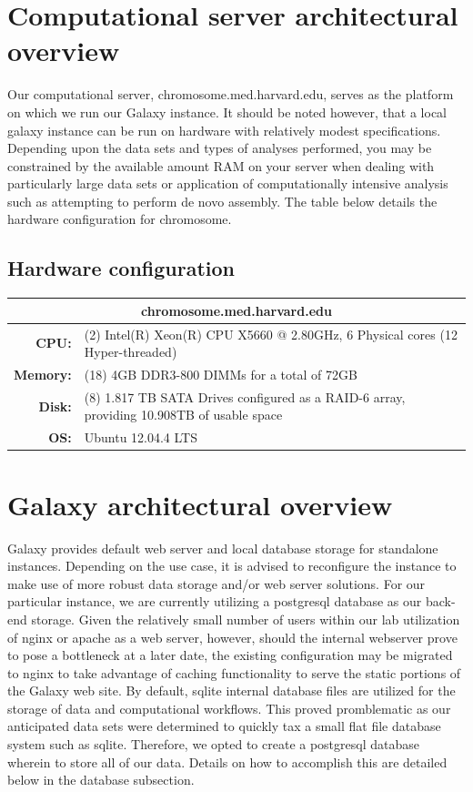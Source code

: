\documentclass[a4paper,10pt]{article}
\begin{document}
\section{Computational server architectural overview}
Our computational server, chromosome.med.harvard.edu, serves as the platform on which we run our Galaxy instance.  It should be noted however, that a local galaxy instance can be run on hardware with relatively modest specifications.  Depending upon the data sets and types of analyses performed, you may be constrained by the available amount RAM on your server when dealing with particularly large data sets or application of computationally intensive analysis such as attempting to perform de novo assembly.  The table below details the hardware configuration for chromosome.
\subsection{Hardware configuration}
\renewcommand{\arraystretch}{1.5}
\begin{tabular}{|r|p{.8\linewidth}|}
\hline
\multicolumn{2}{|c|}{\textbf{chromosome.med.harvard.edu}}\\
\hline
\textbf{CPU:} & (2) Intel(R) Xeon(R) CPU  X5660  @ 2.80GHz, 6 Physical cores (12 Hyper-threaded)\\
\hline
\textbf{Memory:} & (18) 4GB DDR3-800 DIMMs for a total of 72GB\\
\hline
\textbf{Disk:} & (8) 1.817 TB SATA Drives configured as a RAID-6 array, providing 10.908TB of usable space\\
\hline
\textbf{OS:} & Ubuntu 12.04.4 LTS\\
\hline
\end{tabular}
\section{Galaxy architectural overview}
Galaxy provides default web server and local database storage for standalone instances.  Depending on the use case, it is advised to reconfigure the instance to make use of more robust data storage and/or web server solutions.  For our particular instance, we are currently utilizing a postgresql database as our back-end storage.  Given the relatively small number of users within our lab utilization of nginx or apache as a web server, however, should the internal webserver prove to pose a bottleneck at a later date, the existing configuration may be migrated to nginx to take advantage of caching functionality to serve the static portions of the Galaxy web site.  By default, sqlite internal database files are utilized for the storage of data and computational workflows.  This proved promblematic as our anticipated data sets were determined to quickly tax a small flat file database system such as sqlite.  Therefore, we opted to create a postgresql database wherein to store all of our data.  Details on how to accomplish this are detailed below in the database subsection.
\end{document}
